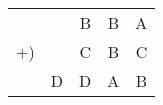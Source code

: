 \documentclass{article}
\begin{document}
\begin{tabular}{rrrrr}
     &   & B & B & A \\
  +) &   & C & B & C \\
  \hline
     & D & D & A & B
\end{tabular}
\end{document}

